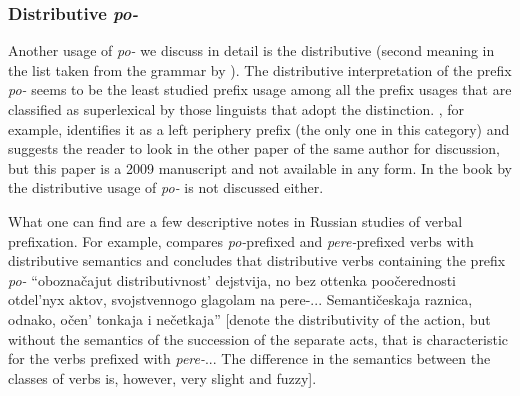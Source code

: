 
\subsubsection{Distributive \textit{po-}}

Another usage of \textit{po-} we discuss in detail is the distributive (second meaning in the list taken from the grammar by \citealt{Shvedova:82}). The distributive interpretation of the prefix \textit{po-} seems to be the least studied prefix usage among all the prefix usages that are classified as superlexical by those linguists that adopt the distinction. \citet{Tatevosov:09}, for example, identifies it as a left periphery prefix (the only one in this category) and suggests the reader to look in the other paper of the same author for discussion, but this paper is a 2009 manuscript and not available in any form. In the book by \citet{Kagan:book} the distributive usage of \textit{po-} is not discussed either. 

What one can find are a few descriptive notes in Russian studies of verbal prefixation. For example, \citet[289--290]{Isachenko:60} compares \textit{po-}prefixed and \textit{pere-}prefixed verbs with distributive semantics and concludes that distributive verbs containing the prefix \textit{po-} ``obozna\v{c}ajut distributivnost' dejstvija, no bez ottenka poo\v{c}erednosti otdel'nyx aktov, svojstvennogo glagolam na pere-... Semanti\v{c}eskaja raznica, odnako, o\v{c}en' tonkaja i ne\v{c}etkaja'' [denote the distributivity of the action, but without the semantics of the succession of the separate acts, that is characteristic for the verbs prefixed with \textit{pere-}... The difference in the semantics between the classes of verbs is, however, very slight and fuzzy].


